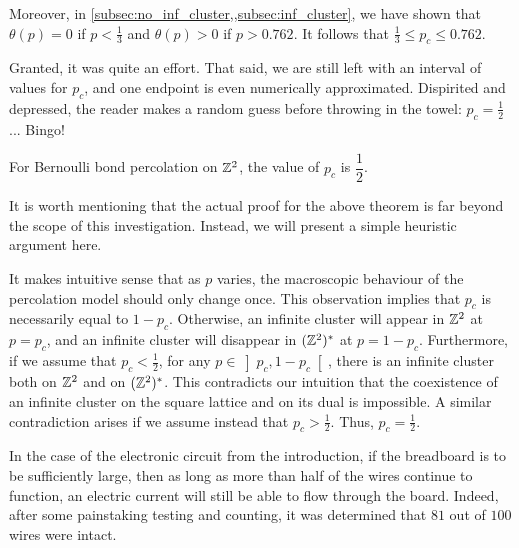 \documentclass[a4paper, 12pt]{article}
\begin{document}
Moreover, in \cref{subsec:no_inf_cluster,,subsec:inf_cluster}, we have shown that $\theta(p) = 0$ if $p < \frac{1}{3}$ and $\theta(p) > 0$ if $p > 0.762$. It follows that $\frac{1}{3} \leq p_c \leq 0.762$. 

Granted, it was quite an effort. That said, we are still left with an interval of values for $p_c$, and one endpoint is even numerically approximated. Dispirited and depressed, the reader makes a random guess before throwing in the towel: $p_c = \frac{1}{2}$ ... Bingo!

\begin{thm}\label{thm:pc_eq_one_half_kesten}
For Bernoulli bond percolation on $\mathbb{Z}^2$, the value of $p_c$ is $\dfrac{1}{2}$.
\end{thm}

It is worth mentioning that the actual proof for the above theorem is far beyond the scope of this investigation. Instead, we will present a simple heuristic argument here.

\begin{hproof}
It makes intuitive sense that as $p$ varies, the macroscopic behaviour of the percolation model should only change once. This observation implies that $p_c$ is necessarily equal to $1 - p_c$. Otherwise, an infinite cluster will appear in $\mathbb{Z}^2$ at $p = p_c$, and an infinite cluster will disappear in $(\mathbb{Z}^2)^*$ at $p = 1 - p_c$. Furthermore, if we assume that $p_c < \frac{1}{2}$, for any $p \in \left]p_c, 1 - p_c\right[$, there is an infinite cluster both on $\mathbb{Z}^2$ and on $(\mathbb{Z}^2)^*$. This contradicts our intuition that the coexistence of an infinite cluster on the square lattice and on its dual is impossible. A similar contradiction arises if we assume instead that $p_c > \frac{1}{2}$. Thus, $p_c = \frac{1}{2}$.
\end{hproof}

In the case of the electronic circuit from the introduction, if the breadboard is to be sufficiently large, then as long as more than half of the wires continue to function, an electric current will still be able to flow through the board. Indeed, after some painstaking testing and counting, it was determined that $81$ out of $100$ wires were intact.
\end{document}
